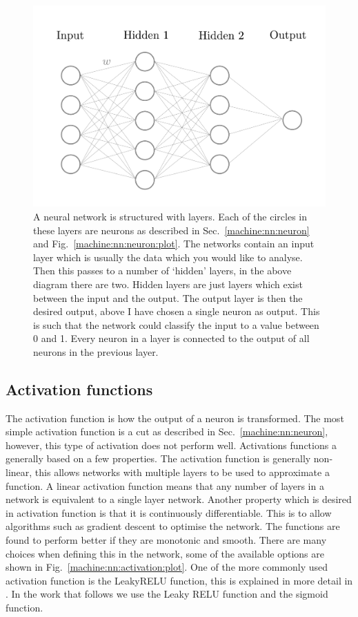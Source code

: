 \begin{figure}[h]
    \centering
    \includegraphics[width=\columnwidth]{C4_cnn/simple_network.pdf}
    \caption[Example structure of a neural network.]{A neural network is structured with layers. Each of the circles in these layers are neurons as described in Sec.~\ref{machine:nn:neuron} and Fig.~\ref{machine:nn:neuron:plot}. The networks contain an input layer which is usually the data which you would like to analyse. Then this passes to a number of `hidden' layers, in the above diagram there are two. Hidden layers are just layers which exist between the input and the output. The output layer is then the desired output, above I have chosen a single neuron as output. This is such that the network could classify the input to a value between 0 and 1. Every neuron in a layer is connected to the output of all neurons in the previous layer.}
    \label{machine:nn:structure:plot}
\end{figure}


\subsection{\label{machine:nn:activation}Activation functions}

The activation function is how the output of a neuron is transformed. 
The most simple activation function is a cut as described in Sec.~\ref{machine:nn:neuron}, however, this type of activation does not perform well.
Activations functions a generally based on a few properties.
The activation function is generally non-linear, this allows networks with multiple layers to be used to approximate a function. A linear activation function means that any number of layers in a network is equivalent to a single layer network.
Another property which is desired in activation function is that it is continuously differentiable. This is to allow algorithms such as gradient descent to optimise the network. 
The functions are found to perform better if they are monotonic and smooth.
There are many choices when defining this in the network, some of the available options are shown in Fig.~\ref{machine:nn:activation:plot}.
One of the more commonly used activation function is the LeakyRELU function, this is explained in more detail in \citep{maas2013RectifierNonlinearities}.
In the work that follows we use the Leaky RELU function and the sigmoid function.



